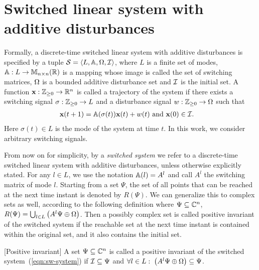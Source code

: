 \section{Switched linear system with additive
  disturbances}\label{sec:switched}

Formally, a discrete-time switched linear system with additive disturbances
is specified by a tuple $\mathcal{S}=\left<L,\mathbb{A},\Omega,\mathcal{I}\right>$, where $L$ is a finite
set of modes, $\mathbb{A}: L\rightarrow\mathbb{M}_{n\times n}(\mathbb{R})$ is a mapping whose image is called the
set of switching matrices, $\Omega$ is a bounded additive
disturbance set and $\mathcal{I}$ is the initial set.
A function $\textbf{x}: \mathbb{Z}_{\geq 0}\rightarrow \mathbb{R}^n$
is called a trajectory of the system if there exists a switching signal
$\sigma:\mathbb{Z}_{\geq 0}\rightarrow L$ and a disturbance signal $w:\mathbb{Z}_{\geq
  0}\rightarrow \Omega$ such that
\begin{equation}\label{eqn:sw-system}
\begin{split}
& \textbf{x}(t+1)=\mathbb{A}(\sigma(t))\textbf{x}(t)+w(t)~\text{and}~
 \textbf{x}(0)\in \mathcal{I}.
\end{split}
\end{equation}
Here $\sigma(t)\in L$ is the mode of the system at time $t$. In this
work, we consider arbitrary switching signals. 

From now on for simplicity, by a \emph{switched system} we refer to a
discrete-time switched linear system with additive disturbances,
unless otherwise explicitly stated.  For any $l\in L$, we use the
notation $\mathbb{A}(l)=A^l$ and call $A^l$ the switching matrix of mode
$l$.
Starting from a set $\Psi$, the set of all points that can be reached at
the next time instant is denoted by $R(\Psi)$.  We can generalize this to
complex sets as well, according to the following definition where
$\Psi\subseteq \mathbb{C}^n$,
%
$R(\Psi)=\bigcup_{l\in L}\left(A^l\Psi\oplus\Omega\right)$.
Then a possibly complex set is called positive invariant of the
switched system if
the reachable set at the next time instant is contained within the original
set, and it also contains the initial set.  
%
\begin{defn}\label{defn:pi}[Positive invariant]
  A set $\Psi\subseteq \mathbb{C}^n$ is called a positive invariant of the
  switched system~(\ref{eqn:sw-system}) if $\mathcal{I}\subseteq \Psi$ and
  $\forall l\in L:\; \left(A^l\Psi\oplus\Omega\right)\subseteq \Psi$.
\end{defn}
%

